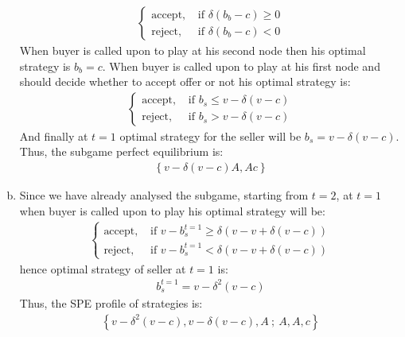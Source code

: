 \documentclass[a4paper]{article}
\begin{document}
\begin{enumerate}[(a)]
\begin{align*}
	\begin{cases}
	\text{accept}, &\text{ if } \delta(b_b - c) \ge 0\\
	\text{reject}, &\text{ if } \delta(b_b - c) < 0
	\end{cases}
	\end{align*}
	When buyer is called upon to play at his second node then his optimal strategy is $b_b = c$. When buyer is called upon to play at his first node and should decide whether to accept offer or not his optimal strategy is:
	\begin{align*}
	\begin{cases}
	\text{accept}, &\text{ if } b_s \le v - \delta(v - c)\\
	\text{reject}, &\text{ if } b_s > v - \delta(v - c)
	\end{cases}
	\end{align*}
	And finally at $t = 1$ optimal strategy for the seller will be $b_s = v - \delta(v - c)$. Thus, the subgame perfect equilibrium is:
	\begin{align*}
	\left\{v - \delta(v - c)A, Ac\right\}
	\end{align*}
	\item Since we have already analysed the subgame, starting from $t = 2$, at $t = 1$ when buyer is called upon to play his optimal strategy will be:
	\begin{align*}
	\begin{cases}
	\text{accept}, & \text{ if } v - b_s^{t=1} \ge \delta(v - v + \delta(v-c))\\
	\text{reject}, &\text{ if } v - b_s^{t=1} < \delta(v - v + \delta(v-c))
	\end{cases}
	\end{align*}
	hence optimal strategy of seller at $t = 1$ is:
	\begin{align*}
	b_s^{t=1} = v - \delta^2(v - c)
	\end{align*}
	Thus, the SPE profile of strategies is:
	\begin{align*}
	\left\{v - \delta^2(v - c),v - \delta(v - c),A\ ;\  A,A,c \right\}
	\end{align*}
\end{enumerate}
\end{document}
